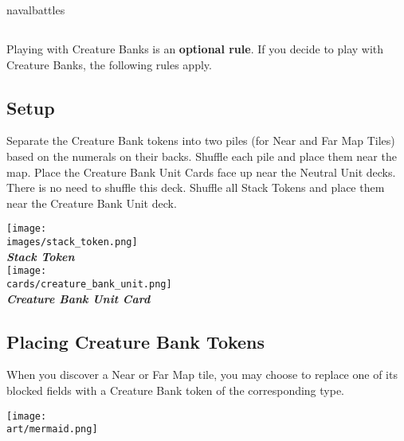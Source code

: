 \begin{expansion}[before=\vspace*{-11mm}]{navalbattles}
  \begin{multicols*}{2}
  \subsection*{}
  Playing with Creature Banks is an \textbf{optional rule}.
  If you decide to play with Creature Banks, the following rules apply.

  \bigskip
  \subsection*{Setup}
  Separate the Creature Bank tokens into two piles (for Near and Far Map Tiles) based on the numerals on their backs.
  Shuffle each pile and place them near the map.
  Place the Creature Bank Unit Cards face up near the Neutral Unit decks.
  There is no need to shuffle this deck.
  Shuffle all Stack Tokens and place them near the Creature Bank Unit deck.

  \bigskip
  \begin{multicols*}{2}
    \begin{center}
      \vspace*{\fill}
      \texttt{[image: \\images/stack\_token.png]}\\
      \textbf{\footnotesize\textit{\textcolor{darkcandyapplered}{Stack Token}}}\\
      \vspace*{\fill}
      \columnbreak
      \texttt{[image: \\cards/creature\_bank\_unit.png]}\\
      \textbf{\footnotesize\textit{\textcolor{darkcandyapplered}{Creature Bank Unit Card}}}
    \end{center}
  \end{multicols*}

  \subsection*{Placing Creature Bank Tokens}
  When you discover a Near or Far Map tile, you may choose to replace one of its blocked fields with a Creature Bank token of the corresponding type.\par

  \begin{center}
    \texttt{[image: \\art/mermaid.png]}
  \end{center}
  \columnbreak


\end{multicols*}
\end{expansion}
